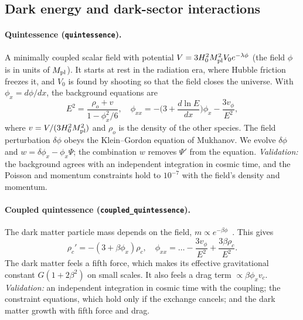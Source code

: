 \subsection{Dark energy and dark-sector interactions}

\paragraph*{Quintessence (\texttt{quintessence}).} A minimally coupled scalar field with potential
$V=3H_0^2M_{\rm pl}^2V_0e^{-\lambda\phi}$ (the field $\phi$ is in units of $M_{\rm pl}$). It starts at rest in the
radiation era, where Hubble friction freezes it, and $V_0$ is found by shooting so that the field closes the
universe. With $\phi_x=d\phi/dx$, the background equations are
\begin{equation}
E^2=\frac{\rho_o+v}{1-\phi_x^2/6},\quad
\phi_{xx}=-\Big(3+\frac{d\ln E}{dx}\Big)\phi_x-\frac{3v_\phi}{E^2},
\end{equation}
where $v=V/(3H_0^2M_{\rm pl}^2)$ and $\rho_o$ is the density of the other species. The field perturbation $\delta\phi$
obeys the Klein--Gordon equation of Mukhanov. We evolve $\delta\phi$ and $w=\delta\phi_x-\phi_x\Psi$; the
combination $w$ removes $\Psi'$ from the equation. \emph{Validation:} the background agrees with an independent
integration in cosmic time, and the Poisson and momentum constraints hold to $10^{-7}$ with the field's density and
momentum.

\paragraph*{Coupled quintessence (\texttt{coupled\_quintessence}).} The dark matter particle mass depends on the
field, $m\propto e^{-\beta\phi}$~\cite{Wetterich1995,Amendola2000}. This gives
\begin{equation}
\rho_c'=-(3+\beta\phi_x)\rho_c,\quad
\phi_{xx}=\dots-\frac{3v_\phi}{E^2}+\frac{3\beta\rho_c}{E^2}.
\end{equation}
The dark matter feels a fifth force, which makes its effective gravitational constant $G(1+2\beta^2)$ on small
scales. It also feels a drag term $\propto\beta\phi_xv_c$. \emph{Validation:} an independent integration in cosmic
time with the coupling; the constraint equations, which hold only if the exchange cancels; and the dark matter
growth with fifth force and drag.

